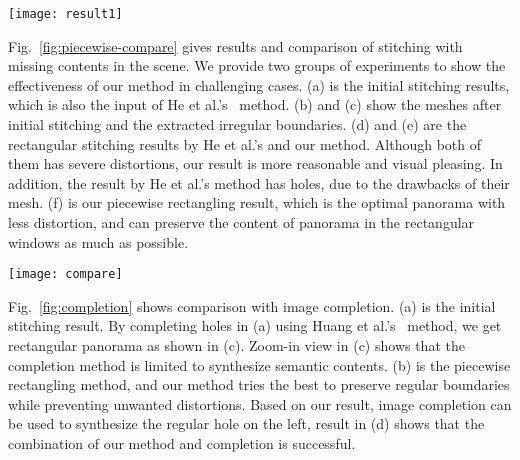 \documentclass[10pt,journal,compsoc]{IEEEtran}
\begin{document}
 \begin{figure*} %
  \centering
  \texttt{[image: result1]}
  \caption{Comparison with state-of-the-art methods. (a) Chen's~\cite{conf/eccv/ChenC16} stitching with global prior. (b) He et al.'s~\cite{journals/tog/HeC013} rectangling stitching. (c) and (d) are Our piecewise rectangling results in the $1_{st}$ iteration with and without line preserving). (e) our final stitching results after several iterations. } \label{fig:result_office}
\end{figure*}

Fig.~\ref{fig:piecewise-compare} gives results and comparison of stitching with missing contents in the scene. We provide two groups of experiments to show the effectiveness of our method in challenging cases. (a) is the initial stitching results, which is also the input of He et al.'s~\cite{journals/tog/HeC013} method. (b) and (c) show the meshes after initial stitching and the extracted irregular boundaries.
(d) and (e) are the rectangular stitching results by He et al.'s and our method. Although both of them has severe distortions, our result is more reasonable and visual pleasing. In addition, the result by He et al.'s method has holes, due to the drawbacks of their mesh. (f) is our piecewise rectangling result, which is the optimal panorama with less distortion, and can preserve the content of panorama in the rectangular windows as much as possible.

\begin{figure*}
  \centering
  \texttt{[image: compare]}
  \caption{Results and comparison of stitching with missing contents. There are two sets of results, and each set is as follows: (a) Initial stitching result with irregular boundaries. (b)  Warped meshes of initial stitching. (c) Irregular boundary extraction. (d) and (e) are rectangling stitching by He's~\cite{journals/tog/HeC013} and our method respectively. (f) our piecewise rectangular stitching result.} \label{fig:piecewise-compare}
\end{figure*}

Fig.~\ref{fig:completion} shows comparison with image completion. (a) is the initial stitching result. By completing holes in (a) using Huang et al.'s~\cite{journals/tog/HuangKAK14} method, we get rectangular panorama as shown in (c). Zoom-in view in (c) shows that the completion method is limited to synthesize semantic contents. (b) is the piecewise rectangling method, and our method tries the best to preserve regular boundaries while preventing unwanted distortions. Based on our result, image completion can be used to synthesize the regular hole on the left, result in (d) shows that the combination of our method and completion is successful.
\end{document}
